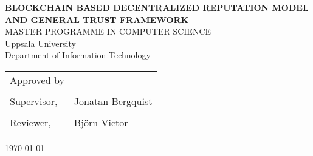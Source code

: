 
\thispagestyle{empty}

\vspace*{+5em}
\begin{center}
\textbf{BLOCKCHAIN BASED DECENTRALIZED REPUTATION MODEL AND GENERAL TRUST FRAMEWORK}\\
\vspace*{+4em}
\vspace{+2em}
MASTER PROGRAMME IN COMPUTER SCIENCE\\

\vspace*{+3em}
Uppsala University\\
Department of Information Technology\\
\vspace*{+2em}

\end{center}

\begin{tabular}{ l l }
 Approved by &   \\
  & \\
  Supervisor, & Jonatan Bergquist \\ 
  & \\
  Reviewer, & Björn Victor \\
\end{tabular}

\vspace*{+4em}

\begin{center}
\today
\end{center}
